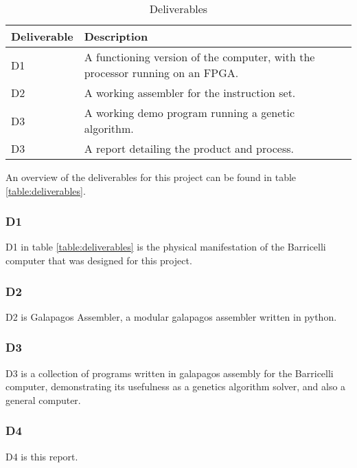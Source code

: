  \begin{table}[h]
 \begin{center}
 \begin{tabular}{| l | p{8cm} |}
 \hline
 Deliverable & Description \\
 \hline
 D1 & A functioning version of the computer, with the processor running on an FPGA.\\
 D2 & A working assembler for the instruction set.\\
 D3 & A working demo program running a genetic algorithm.\\
 D3 & A report detailing the product and process.\\
 \hline
 \end{tabular}
 \caption{Deliverables}
 \label{table:deliverables}
 \end{center}
 \end{table}

An overview of the deliverables for this project can be found in table \vref{table:deliverables}.

\subsubsection{D1}

D1 in table \vref{table:deliverables} is the physical manifestation of the Barricelli computer that was designed for this project.

\subsubsection{D2}

D2 is Galapagos Assembler, a modular \gls{galapagos} assembler written in python.

\subsubsection{D3}

D3 is a collection of programs written in galapagos assembly for the Barricelli computer, demonstrating its usefulness as a genetics algorithm solver, and also a general computer.

\subsubsection{D4}

D4 is this report.

